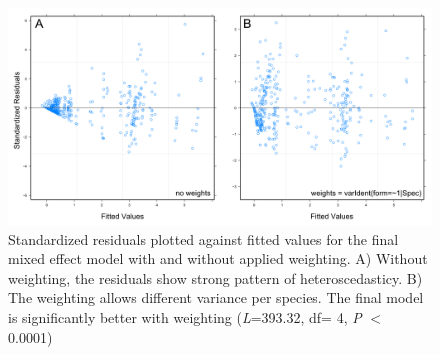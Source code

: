 \clearpage

\begin{figure} [H] %
\centering
\includegraphics[width=15cm]{Images/residuals}
 \caption{Standardized residuals plotted against fitted values for the final mixed effect model with and without applied weighting. A) Without weighting, the residuals show strong pattern of heteroscedasticy. B) The weighting allows different variance per species. The final model is significantly better with weighting (\textit{L}=393.32, df= 4, \textit{P} $<$ 0.0001)}
 \label{fig:residuals}
\end{figure}


